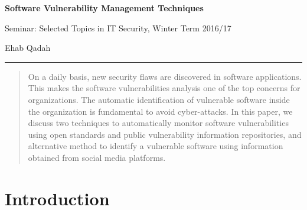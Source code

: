 \documentclass{llncs}
\begin{document}
\begin{flushleft}
 
 \thispagestyle{empty}
\centering\LARGE {\bf Software Vulnerability Management Techniques}




\vspace{2pt}


\centering
 Seminar: Selected Topics in IT Security,
 Winter Term 2016/17



\centering
 Ehab Qadah\\
\rule{\textwidth}{1pt}



 

\end{flushleft}




\begin{abstract}
On a daily basis, new security flaws are discovered in software applications. This makes the software vulnerabilities analysis one of the top concerns for organizations. The automatic identification of vulnerable software inside the organization is fundamental to avoid cyber-attacks. In this paper, we discuss two techniques to automatically monitor software vulnerabilities using open standards and public vulnerability information repositories, and alternative method to identify a vulnerable software using information obtained from social media platforms. 
\end{abstract}

\section{Introduction}
\end{document}
